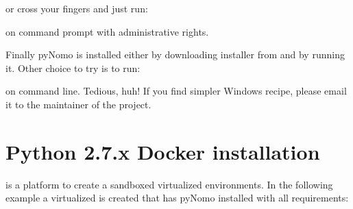 \documentclass[a4paper,11pt,english]{sphinxmanual}
\begin{document}
or cross your fingers and just run:

\begin{sphinxVerbatim}[commandchars=\\\{\},formatcom=\scriptsize]
     
\end{sphinxVerbatim}

on command prompt with administrative rights.

Finally pyNomo is installed either by downloading installer from   and by running it. Other choice to try is to run:

\begin{sphinxVerbatim}[commandchars=\\\{\},formatcom=\scriptsize]
   
\end{sphinxVerbatim}

on command line. Tedious, huh! If you find simpler Windows recipe, please email it to the maintainer of the project.


\section{Python 2.7.x Docker installation}
\label{\detokenize{installation/installation:python-2-7-x-docker-installation}}
 is a platform to create a sandboxed virtualized environments. In the following example  a virtualized
 is created that has pyNomo installed with all requirements:
\end{document}
